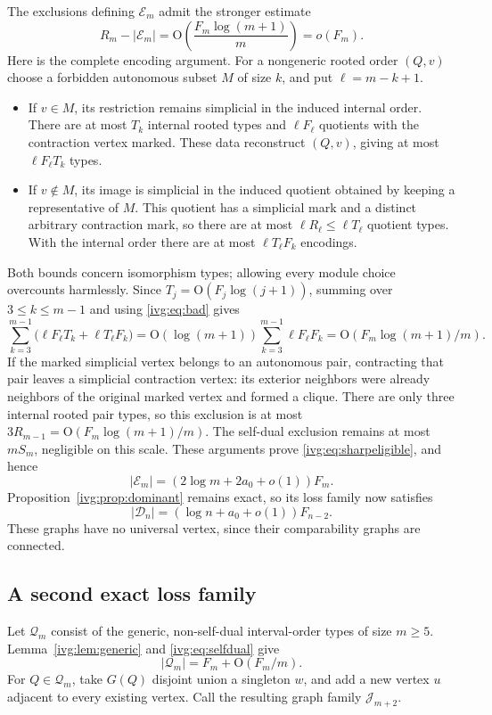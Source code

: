 \documentclass[11pt,letterpaper]{article}
\theoremstyle{definition}\newtheorem{definition}[theorem]{Definition}
\theoremstyle{remark}\newtheorem{remark}[theorem]{Remark}
\newcommand{\OO}{\mathrm O}
\begin{document}
The exclusions defining $\mathcal E_m$ admit the stronger estimate
\begin{equation}\label{ivg:eq:sharpeligible}
 R_m-|\mathcal E_m|=\OO\!\left(\frac{F_m\log(m+1)}m\right)=o(F_m).
\end{equation}
Here is the complete encoding argument. For a nongeneric rooted order $(Q,v)$ choose a forbidden autonomous subset $M$ of size $k$, and put $\ell=m-k+1$.
\begin{itemize}
\item If $v\in M$, its restriction remains simplicial in the induced internal order. There are at most $T_k$ internal rooted types and $\ell F_\ell$ quotients with the contraction vertex marked. These data reconstruct $(Q,v)$, giving at most $\ell F_\ell T_k$ types.
\item If $v\notin M$, its image is simplicial in the induced quotient obtained by keeping a representative of $M$. This quotient has a simplicial mark and a distinct arbitrary contraction mark, so there are at most $\ell R_\ell\le\ell T_\ell$ quotient types. With the internal order there are at most $\ell T_\ell F_k$ encodings.
\end{itemize}
Both bounds concern isomorphism types; allowing every module choice overcounts harmlessly. Since $T_j=\OO(F_j\log(j+1))$, summing over $3\le k\le m-1$ and using \eqref{ivg:eq:bad} gives
\[
 \sum_{k=3}^{m-1}\bigl(\ell F_\ell T_k+\ell T_\ell F_k\bigr)
 =\OO(\log(m+1))\sum_{k=3}^{m-1}\ell F_\ell F_k
 =\OO(F_m\log(m+1)/m).
\]
If the marked simplicial vertex belongs to an autonomous pair, contracting that pair leaves a simplicial contraction vertex: its exterior neighbors were already neighbors of the original marked vertex and formed a clique. There are only three internal rooted pair types, so this exclusion is at most
$3R_{m-1}=\OO(F_m\log(m+1)/m)$. The self-dual exclusion remains at most $mS_m$, negligible on this scale. These arguments prove \eqref{ivg:eq:sharpeligible}, and hence
\begin{equation}\label{ivg:eq:Econstant}
 |\mathcal E_m|=(2\log m+2a_0+o(1))F_m.
\end{equation}
Proposition~\ref{ivg:prop:dominant} remains exact, so its loss family now satisfies
\begin{equation}\label{ivg:eq:Dconstant}
 |\mathcal D_n|=(\log n+a_0+o(1))F_{n-2}.
\end{equation}
These graphs have no universal vertex, since their comparability graphs are connected.

\subsection{A second exact loss family}
Let $\mathcal Q_m$ consist of the generic, non-self-dual interval-order types of size $m\ge5$. Lemma~\ref{ivg:lem:generic} and \eqref{ivg:eq:selfdual} give
\begin{equation}\label{ivg:eq:Qfamily}
 |\mathcal Q_m|=F_m+\OO(F_m/m).
\end{equation}
For $Q\in\mathcal Q_m$, take $G(Q)$ disjoint union a singleton $w$, and add a new vertex $u$ adjacent to every existing vertex. Call the resulting graph family $\mathcal J_{m+2}$.
\end{document}

